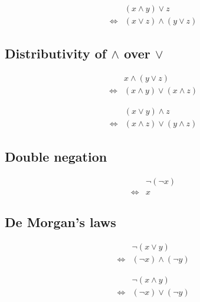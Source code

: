 \begin{prop}
\label{Proposition:lor_land_distributivity_2}
\begin{align*}
& (x \land y) \lor z \\
\iff & (x \lor z) \land (y \lor z)
\end{align*}
\end{prop}

\subsection{Distributivity of $\land$ over $\lor$}
\begin{prop}
\label{Proposition:land_lor_distributivity_1}
\begin{align*}
& x \land (y \lor z) \\
\iff & (x \land y) \lor (x \land z)
\end{align*}
\end{prop}

\begin{prop}
\label{Proposition:land_lor_distributivity_2}
\begin{align*}
& (x \lor y) \land z \\
\iff & (x \land z) \lor (y \land z)
\end{align*}
\end{prop}

\subsection{Double negation}
\begin{prop}
\label{Proposition:double_negation}
\begin{align*}
& \lnot (\lnot x) \\
\iff & x
\end{align*}
\end{prop}

\subsection{De Morgan's laws}
\begin{prop}
\label{Proposition:De_Morgan_lor}
\begin{align*}
& \lnot (x \lor y) \\
\iff & (\lnot x) \land (\lnot y)
\end{align*}
\end{prop}

\begin{prop}
\label{Proposition:De_Morgan_land}
\begin{align*}
& \lnot (x \land y) \\
\iff & (\lnot x) \lor (\lnot y)
\end{align*}
\end{prop}

